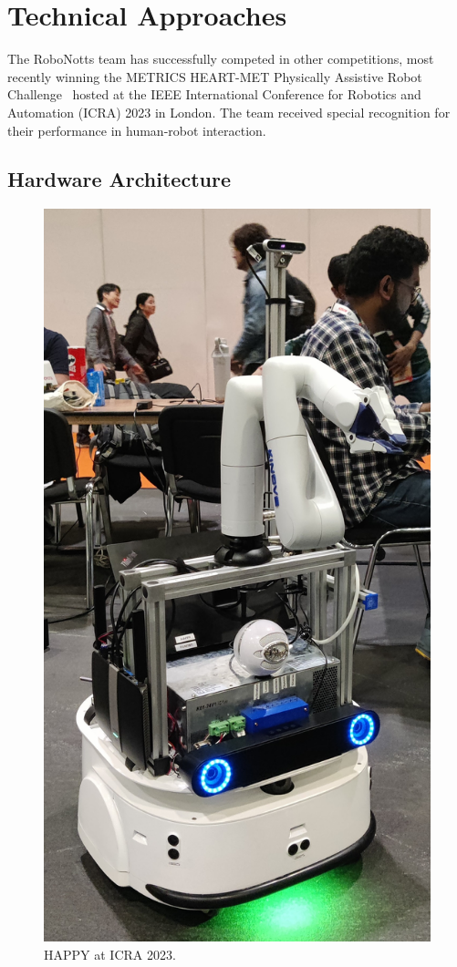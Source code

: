 \section{Technical Approaches}
The RoboNotts team has successfully competed in other competitions, most recently winning the METRICS HEART-MET Physically Assistive Robot Challenge~\cite{ref_url1} hosted at the IEEE International Conference for Robotics and Automation (ICRA) 2023 in London. The team received special recognition for their performance in human-robot interaction.

\subsection{Hardware Architecture}

\begin{figure}
\centering
\includegraphics[scale=0.04]{HAPPY}
\caption{HAPPY at ICRA 2023.} \label{fig.1}
\end{figure}
